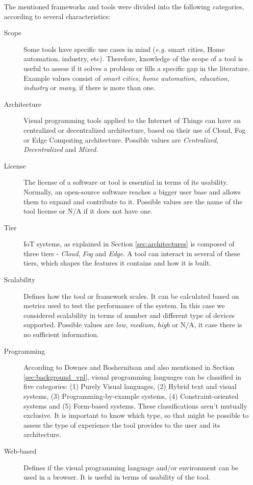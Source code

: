 The mentioned frameworks and tools were divided into the following categories, according to several characteristics:

\begin{description}
    \item [Scope] Some tools have specific use cases in mind (\textit{e.g.} smart cities, Home automation, industry, etc). Therefore, knowledge of the scope of a tool is useful to assess if it solves a problem or fills a specific gap in the literature. Example values consist of \textit{smart cities, home automation, education, industry} or \textit{many}, if there is more than one. 
    \item [Architecture] Visual programming tools applied to the Internet of Things can have an centralized or decentralized architecture, based on their use of Cloud, Fog or Edge Computing architecture. Possible values are \textit{Centralized}, \textit{Decentralized} and \textit{Mixed}.
    \item [License] The license of a software or tool is essential in terms of its usability. Normally, an open-source software reaches a bigger user base and allows them to expand and contribute to it. Possible values are the name of the tool license or N/A if it does not have one.
    \item [Tier] IoT systems, as explained in Section \ref{sec:architectures} is composed of three tiers - \textit{Cloud}, \textit{Fog} and \textit{Edge}. A tool can interact in several of these tiers, which shapes the features it contains and how it is built.
    \item [Scalability] Defines how the tool or framework scales. It can be calculated based on metrics used to test the performance of the system. In this case we considered scalability in terms of number and different type of devices supported. Possible values are \textit{low}, \textit{medium}, \textit{high} or N/A, it case there is no sufficient information.
    \item [Programming] According to Downes and Boshernitsan \cite{vpls_survey} and also mentioned in Section \ref{sec:background_vpl}, visual programming languages can be classified in five categories: (1) Purely Visual languages, (2) Hybrid text and visual systems, (3) Programming-by-example systems, (4) Constraint-oriented systems and (5) Form-based systems. These classifications aren't mutually exclusive. It is important to know which type, so that might be possible to assess the type of experience the tool provides to the user and its architecture.
    \item [Web-based] Defines if the visual programming language and/or environment can be used in a browser. It is useful in terms of usability of the tool.
\end{description}

